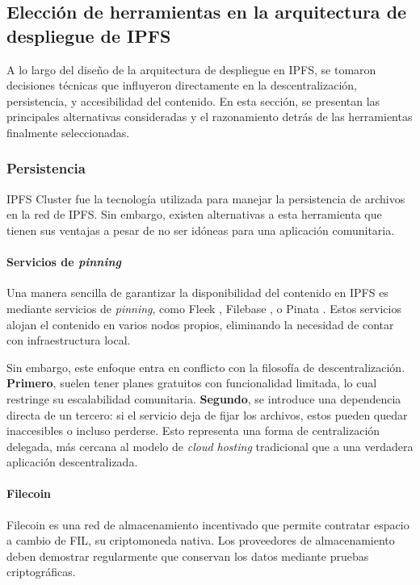 \subsection{Elección de herramientas en la arquitectura de despliegue de IPFS}

A lo largo del diseño de la arquitectura de despliegue en IPFS, se tomaron decisiones técnicas que influyeron directamente en la descentralización, persistencia, y accesibilidad del contenido. En esta sección, se presentan las principales alternativas consideradas y el razonamiento detrás de las herramientas finalmente seleccionadas.

\subsubsection{Persistencia}

IPFS Cluster fue la tecnología utilizada para manejar la persistencia de archivos en la red de IPFS. Sin embargo, existen alternativas a esta herramienta que tienen sus ventajas a pesar de no ser idóneas para una aplicación comunitaria.

\paragraph{Servicios de \textit{pinning}}
Una manera sencilla de garantizar la disponibilidad del contenido en IPFS es mediante servicios de \textit{pinning}, como Fleek \cite{fleek}, Filebase \cite{filebase}, o Pinata \cite{pinata}. Estos servicios alojan el contenido en varios nodos propios, eliminando la necesidad de contar con infraestructura local.

Sin embargo, este enfoque entra en conflicto con la filosofía de descentralización. \textbf{Primero}, suelen tener planes gratuitos con funcionalidad limitada, lo cual restringe su escalabilidad comunitaria. \textbf{Segundo}, se introduce una dependencia directa de un tercero: si el servicio deja de fijar los archivos, estos pueden quedar inaccesibles o incluso perderse. Esto representa una forma de centralización delegada, más cercana al modelo de \textit{cloud hosting} tradicional que a una verdadera aplicación descentralizada.

\paragraph{Filecoin}
Filecoin \cite{filecoin} es una red de almacenamiento incentivado que permite contratar espacio a cambio de FIL, su criptomoneda nativa. Los proveedores de almacenamiento deben demostrar regularmente que conservan los datos mediante pruebas criptográficas.


